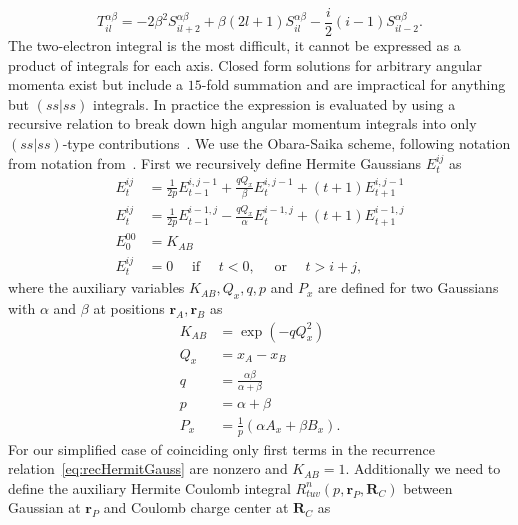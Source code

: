 \documentclass[final,3p,times,twocolumn]{elsarticle}
\begin{document}
	\begin{equation}
		T_{il}^{\alpha \beta} = -2\beta^{2}S_{il+2}^{\alpha \beta}+\beta(2l+1)S_{il}^{\alpha \beta}-\frac{i}{2}(i-1)S_{il-2}^{\alpha \beta}.
	\end{equation}
	The two-electron integral is the most difficult, it cannot be expressed as a product of integrals for each axis. Closed form solutions for arbitrary angular momenta exist but include a $15$-fold summation and are impractical for anything but $(ss|ss)$ integrals. In practice the expression is evaluated by using a recursive relation to break down high angular momentum integrals into only $(ss|ss)$-type contributions~\cite{fermann2020fundamentals}. We use the Obara-Saika scheme, following notation from notation from~\cite{helgaker1995gaussian}. First we recursively define Hermite Gaussians $E_{t}^{i j}$ as
	\begin{equation}
		\begin{aligned}
			E_{t}^{i j} &= \frac{1}{2 p} E_{t-1}^{i, j-1}+\frac{q Q_{x}}{\beta} E_{t}^{i, j-1}+(t+1) E_{t+1}^{i, j-1} \\ E_{t}^{i j} &=\frac{1}{2 p} E_{t-1}^{i-1, j}-\frac{q Q_{x}}{\alpha} E_{t}^{i-1, j}+(t+1) E_{t+1}^{i-1, j} \\ E_{0}^{00}&=K_{A B} \\ 
			E_{t}^{i j}&=0 \quad \text { if } \quad t<0, \quad \text { or } \quad t>i+j,
		\label{eq:recHermitGauss}
		\end{aligned}
	\end{equation}
	where the auxiliary variables $K_{AB}, Q_x, q, p$ and $P_x$ are defined for two Gaussians with $\alpha$ and $\beta$ at positions $\mathbf{r}_A, \mathbf{r}_B$ as
	\begin{equation}
		\begin{aligned} 
			K_{A B} &=\exp \left(-q Q_{x}^{2}\right) \\ Q_{x} 
			&=x_{A}-x_{B} \\ q 
			&=\frac{\alpha \beta}{\alpha+\beta} \\ p 
			&=\alpha+\beta\\ 
			P_{x} &=\frac{1}{p}\left(\alpha A_{x}+\beta B_{x}\right).
		\end{aligned}
	\end{equation}
	For our simplified case of coinciding only first terms in the recurrence relation~\eqref{eq:recHermitGauss} are nonzero and $K_{AB}=1$. Additionally we need to define the auxiliary Hermite Coulomb integral $R_{t u v}^{n}(p, \mathbf{r}_P, \mathbf{R}_C)$ between Gaussian at $\mathbf{r}_P$ and Coulomb charge center at $\mathbf{R}_C$ as
\end{document}
